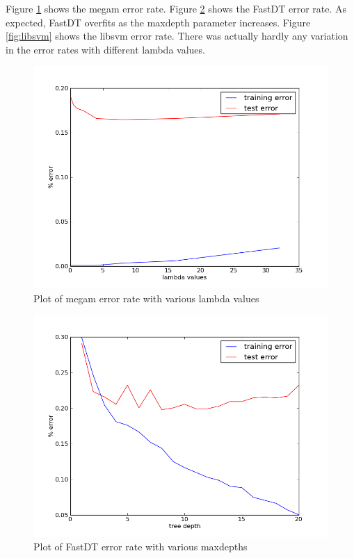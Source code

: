     Figure \ref{fig:megam} shows the megam error rate. Figure \ref{fig:fastdt} shows the FastDT error rate. As expected, FastDT overfits as the maxdepth parameter increases. Figure \ref{fig:libsvm} shows the libsvm error rate. There was actually hardly any variation in the error rates with different lambda values.

    \begin{figure}
	    \caption{Plot of megam error rate with various lambda values}
	    \label{fig:megam}
	    \includegraphics[width=6in]{images/wu6_megam.png}
    \end{figure}

    \begin{figure}
	    \caption{Plot of FastDT error rate with various maxdepths}
	    \label{fig:fastdt}
	    \includegraphics[width=6in]{images/wu6_fastdt.png}
    \end{figure}

